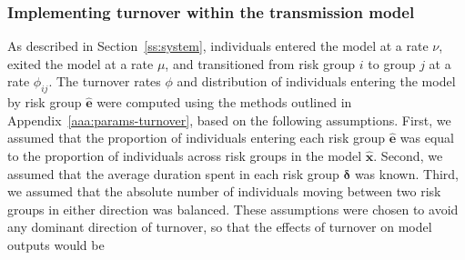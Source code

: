 \subsubsection{Implementing turnover within the transmission model}
As described in Section~\ref{ss:system}, individuals
entered the model at a rate $\nu$,
exited the model at a rate $\mu$,
and transitioned from risk group $i$ to group $j$ at a rate $\phi_{ij}$.
The turnover rates $\phi$ and
distribution of individuals entering the model by risk group $\bm{\hat{e}}$
were computed using the methods outlined in
Appendix~\ref{aaa:params-turnover}, based on the following assumptions.
First, we assumed that
the proportion of individuals entering each risk group $\bm{\hat{e}}$
was equal to the proportion of individuals across risk groups in the model $\bm{\hat{x}}$.
Second, we assumed that
the average duration spent in each risk group $\bm{\delta}$ was known.
Third, we assumed that
the absolute number of individuals moving between two risk groups in either direction was balanced.
These assumptions were chosen to avoid any dominant direction of turnover,
so that the effects of turnover on model outputs would be
